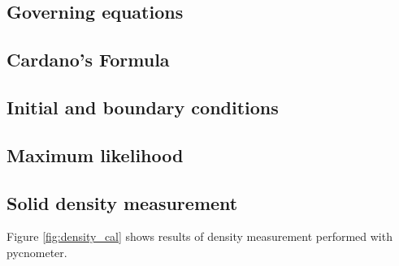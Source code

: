 \documentclass[a4paper,fleqn]{cas-dc}
\begin{document}
\subsection{Governing equations}


%
%

\subsection{Cardano's Formula} \label{CH: Cardano}


\subsection{Initial and boundary conditions} \label{CH: IC_BC}


%

\subsection{Maximum likelihood} \label{CH: ML}


\subsection{Solid density measurement} \label{CH: Solid_Density_Measurment}

Figure \ref{fig:density_cal} shows results of density measurement performed with pycnometer.
\end{document}
